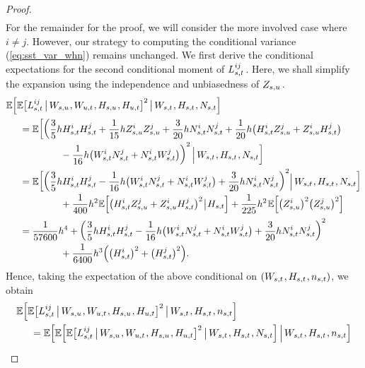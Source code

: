 \documentclass[sn-mathphys-num]{sn-jnl}%
\newcommand{\E}{\mathbb{E}}
\newcommand{\m}{\hspace{0.25mm}}
\newcommand{\mm}{\hspace{5mm}}
\begin{document}
\begin{proof}
\begin{align*}
\end{align*}
For the remainder for the proof, we will consider the more involved case where $i\neq j$. However, our strategy to computing the conditional variance (\ref{eq:sst_var_whn}) remains unchanged.
We first derive the conditional expectations for the second conditional moment of $L_{s,t}^{ij}\m$.
Here, we shall simplify the expansion using the independence and unbiasedness of $Z_{s,u}\m$.
\begin{align*}
&\E\Big[\E\big[L_{s,t}^{ij}\,\big|\, W_{s,u}\m, W_{u,t}\m, H_{s,u}\m, H_{u,t}\big]^2\,\big|\, W_{s,t}\m, H_{s,t}\m, N_{s,t}\Big]\\
&\mm= \E\bigg[\bigg(\frac{3}{5}h H_{s,t}^i H_{s,t}^j + \frac{1}{15}h Z_{s,u}^i Z_{s,u}^j + \frac{3}{20}h N_{s,t}^i N_{s,t}^j + \frac{1}{20}h\big(H_{s,t}^i Z_{s,u}^j + Z_{s,u}^i H_{s,t}^j\big)\\[-3pt]
&\hspace{20mm} - \frac{1}{16}h\big(W_{s,t}^i N_{s,t}^j + N_{s,t}^i W_{s,t}^j\big)\bigg)^2\,\Big|\, W_{s,t}\m, H_{s,t}\m, N_{s,t}\bigg]\\[-2pt]
&\mm = \E\bigg[\bigg(\frac{3}{5}h H_{s,t}^i H_{s,t}^j - \frac{1}{16}h\big(W_{s,t}^i N_{s,t}^j + N_{s,t}^i W_{s,t}^j\big) + \frac{3}{20}h N_{s,t}^i N_{s,t}^j \bigg)^2\Big|\, W_{s,t}\m, H_{s,t}\m, N_{s,t}\bigg]\\[-3pt]
&\hspace{20mm} + \frac{1}{400}h^2\E\Big[\big(H_{s,t}^i Z_{s,u}^j + Z_{s,u}^i H_{s,t}^j\big)^2\m\big|\m H_{s,t}\Big]  + \frac{1}{225}h^2\m\E\Big[\big(Z_{s,u}^i\big)^2\big(Z_{s,u}^j\big)^2\Big]\\[1pt]
&\mm = \frac{1}{57600}h^4 + \bigg(\frac{3}{5}h H_{s,t}^i H_{s,t}^j - \frac{1}{16}h\big(W_{s,t}^i N_{s,t}^j + N_{s,t}^i W_{s,t}^j\big) + \frac{3}{20}h N_{s,t}^i N_{s,t}^j \bigg)^2\\[-3pt]
&\hspace{20mm} + \frac{1}{6400}h^3 \Big(\big(H_{s,t}^i\big)^2 + \big(H_{s,t}^j\big)^2\Big).
\end{align*}
Hence, taking the expectation of the above conditional on $(W_{s,t}\m, H_{s,t}\m, n_{s,t})$, we obtain
\begin{align*}
&\E\Big[\E\big[L_{s,t}^{ij}\,\big|\, W_{s,u}\m, W_{u,t}\m, H_{s,u}\m, H_{u,t}\big]^2\,\big|\, W_{s,t}\m, H_{s,t}\m, n_{s,t}\Big]\\
&\mm = \E\Big[\E\Big[\E\big[L_{s,t}^{ij}\,\big|\, W_{s,u}\m, W_{u,t}\m, H_{s,u}\m, H_{u,t}\big]^2\,\big|\, W_{s,t}\m, H_{s,t}\m, N_{s,t}\Big]\,\Big|\, W_{s,t}\m, H_{s,t}\m, n_{s,t}\Big]\\[2pt]

\end{align*}
\end{proof}
\end{document}
